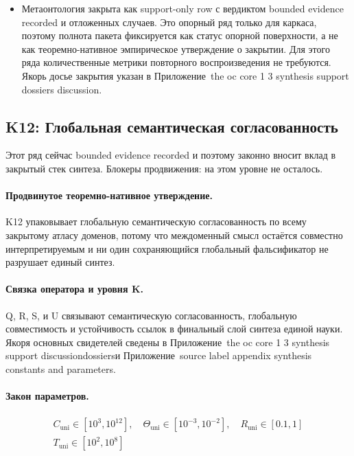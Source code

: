 \begin{itemize}[leftmargin=1.6em,nosep]
\item Метаонтология закрыта как support-only row с вердиктом bounded evidence recorded и  отложенных случаев. Это опорный ряд только для каркаса, поэтому полнота пакета фиксируется как статус опорной поверхности, а не как теоремно-нативное эмпирическое утверждение о закрытии. Для этого ряда количественные метрики повторного воспроизведения не требуются. Якорь досье закрытия указан в Приложение~the oc core 1 3 synthesis support dossiers discussion.
\end{itemize}

\subsection{K12: Глобальная семантическая согласованность}
\label{sec:oc-core-1-3-synthesis-k12}
Этот ряд сейчас bounded evidence recorded и поэтому законно вносит вклад в закрытый стек синтеза.
Блокеры продвижения: на этом уровне не осталось.

\paragraph{Продвинутое теоремно-нативное утверждение.}
K12 упаковывает глобальную семантическую согласованность по всему закрытому атласу доменов, потому что междоменный смысл остаётся совместно интерпретируемым и ни один сохраняющийся глобальный фальсификатор не разрушает единый синтез.

\paragraph{Связка оператора и уровня K.}
Q, R, S, и U связывают семантическую согласованность, глобальную совместимость и устойчивость ссылок в финальный слой синтеза единой науки.
Якоря основных свидетелей сведены в Приложение~the oc core 1 3 synthesis support discussiondossiersи Приложение~source label appendix synthesis constants and parameters.

\paragraph{Закон параметров.}
\[
\begin{gathered} C_{\mathrm{uni}} \in [10^3,10^{12}],\quad \Theta_{\mathrm{uni}} \in [10^{-3},10^{-2}],\quad R_{\mathrm{uni}} \in [0.1,1] \\ T_{\mathrm{uni}} \in [10^2,10^8] \end{gathered}
\]

